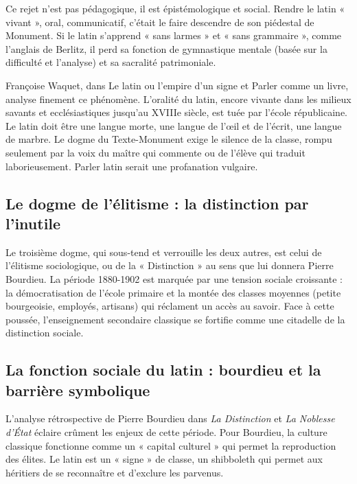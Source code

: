 Ce rejet n'est pas pédagogique, il est épistémologique et social. Rendre le latin « vivant », oral,
communicatif, c'était le faire descendre de son piédestal de Monument. Si le latin s'apprend « sans
larmes » et « sans grammaire », comme l'anglais de Berlitz, il perd sa fonction de gymnastique
mentale (basée sur la difficulté et l'analyse) et sa sacralité patrimoniale.

Françoise Waquet, dans Le latin ou l'empire d'un signe et Parler comme un livre, analyse finement ce
phénomène.\cite{I-1-3-ref36} L'oralité du latin, encore vivante dans les milieux savants et
ecclésiastiques jusqu'au XVIIIe siècle, est tuée par l'école républicaine. Le latin doit être une
langue morte, une langue de l'œil et de l'écrit, une langue de marbre. Le dogme du Texte-Monument
exige le silence de la classe, rompu seulement par la voix du maître qui commente ou de l'élève qui
traduit laborieusement. Parler latin serait une profanation vulgaire.



\subsection{Le dogme de l'élitisme : la distinction par l'inutile}

Le troisième dogme, qui sous-tend et verrouille les deux autres, est celui de l'élitisme
sociologique, ou de la « Distinction » au sens que lui donnera Pierre Bourdieu. La période 1880-1902
est marquée par une tension sociale croissante : la démocratisation de l'école primaire et la montée
des classes moyennes (petite bourgeoisie, employés, artisans) qui réclament un accès au savoir. Face
à cette poussée, l'enseignement secondaire classique se fortifie comme une citadelle de la
distinction sociale.



\subsection{La fonction sociale du latin : bourdieu et la barrière symbolique}

L'analyse rétrospective de Pierre Bourdieu dans \textit{La Distinction} et \textit{La Noblesse
d'État} éclaire crûment les enjeux de cette période.\cite{I-1-3-ref38} Pour Bourdieu, la culture
classique fonctionne comme un « capital culturel » qui permet la reproduction des élites. Le latin
est un « signe » de classe, un shibboleth qui permet aux héritiers de se reconnaître et d'exclure
les parvenus.



